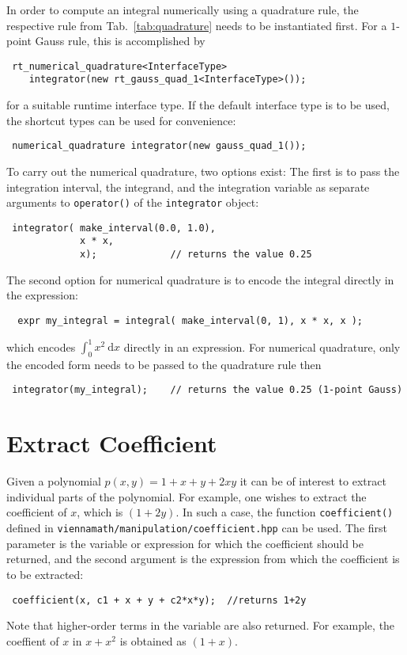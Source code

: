 In order to compute an integral numerically using a quadrature rule, the respective rule from Tab.~\ref{tab:quadrature} needs to be instantiated first.
For a $1$-point Gauss rule, this is accomplished by
\begin{lstlisting}
 rt_numerical_quadrature<InterfaceType> 
    integrator(new rt_gauss_quad_1<InterfaceType>());
\end{lstlisting}
for a suitable runtime interface type. If the default interface type is to be used, the shortcut types can be used for convenience:
\begin{lstlisting}
 numerical_quadrature integrator(new gauss_quad_1());
\end{lstlisting}
To carry out the numerical quadrature, two options exist: The first is to pass the integration interval, the integrand, and
the integration variable as separate arguments to \lstinline|operator()| of the \lstinline|integrator| object:
\begin{lstlisting}
 integrator( make_interval(0.0, 1.0),
             x * x,
             x);             // returns the value 0.25
\end{lstlisting}
The second option for numerical quadrature is to encode the integral directly in the expression:
\begin{lstlisting}
  expr my_integral = integral( make_interval(0, 1), x * x, x );
\end{lstlisting}
which encodes $\int_0^1 x^2 \: \mathrm{d} x$ directly in an expression. For numerical quadrature, only the encoded form needs to be passed to the quadrature
rule then
\begin{lstlisting}
 integrator(my_integral);    // returns the value 0.25 (1-point Gauss)
\end{lstlisting}



 \section{Extract Coefficient}
Given a polynomial $p(x,y) = 1 + x + y + 2xy$ it can be of interest to extract individual parts of the polynomial.
For example, one wishes to extract the coefficient of $x$, which is $(1+2y)$. In such a case, 
the function \lstinline|coefficient()| defined in \lstinline|viennamath/manipulation/coefficient.hpp| can be used.
The first parameter is the variable or expression for which the coefficient should be returned, and the second argument is the expression from which the
coefficient is to be extracted:
\begin{lstlisting}
 coefficient(x, c1 + x + y + c2*x*y);  //returns 1+2y
\end{lstlisting}
Note that higher-order terms in the variable are also returned. For example, the coeffient of $x$ in $x+x^2$ is obtained as $(1+x)$.

